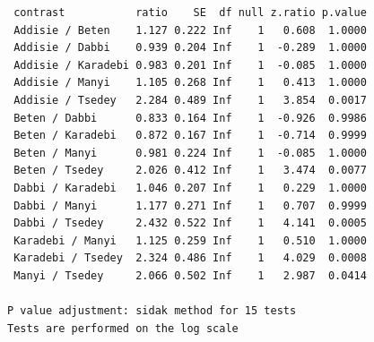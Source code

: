 \documentclass[
  letterpaper,
  DIV=11,
  numbers=noendperiod]{scrartcl}
\begin{document}
\begin{verbatim}
 contrast           ratio    SE  df null z.ratio p.value
 Addisie / Beten    1.127 0.222 Inf    1   0.608  1.0000
 Addisie / Dabbi    0.939 0.204 Inf    1  -0.289  1.0000
 Addisie / Karadebi 0.983 0.201 Inf    1  -0.085  1.0000
 Addisie / Manyi    1.105 0.268 Inf    1   0.413  1.0000
 Addisie / Tsedey   2.284 0.489 Inf    1   3.854  0.0017
 Beten / Dabbi      0.833 0.164 Inf    1  -0.926  0.9986
 Beten / Karadebi   0.872 0.167 Inf    1  -0.714  0.9999
 Beten / Manyi      0.981 0.224 Inf    1  -0.085  1.0000
 Beten / Tsedey     2.026 0.412 Inf    1   3.474  0.0077
 Dabbi / Karadebi   1.046 0.207 Inf    1   0.229  1.0000
 Dabbi / Manyi      1.177 0.271 Inf    1   0.707  0.9999
 Dabbi / Tsedey     2.432 0.522 Inf    1   4.141  0.0005
 Karadebi / Manyi   1.125 0.259 Inf    1   0.510  1.0000
 Karadebi / Tsedey  2.324 0.486 Inf    1   4.029  0.0008
 Manyi / Tsedey     2.066 0.502 Inf    1   2.987  0.0414

P value adjustment: sidak method for 15 tests 
Tests are performed on the log scale 
\end{verbatim}
\end{document}
